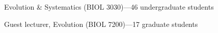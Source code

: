\begin{tightItemize}
    \item Evolution \& Systematics (BIOL 3030)---46 undergraduate students
    \item Guest lecturer, Evolution (BIOL 7200)---17 graduate students
\end{tightItemize}
